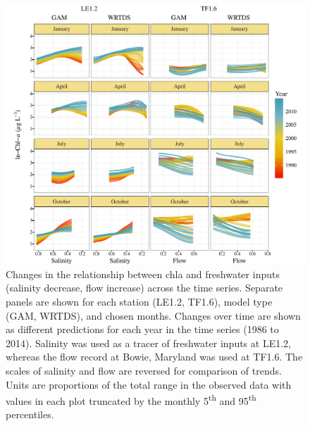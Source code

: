\documentclass{svjour3}\usepackage[]{graphicx}\usepackage[]{color}
\begin{document}
\begin{figure}[!ht]

{\centering \includegraphics[width=1.02\textwidth]{figs/dynafig-1} 

}

\caption{Changes in the relationship between \ac{chla} and freshwater inputs (salinity decrease, flow increase) across the time series.  Separate panels are shown for each station (LE1.2, TF1.6), model type (GAM, WRTDS), and chosen months.  Changes over time are shown as different predictions for each year in the time series (1986 to 2014).  Salinity was used as a tracer of freshwater inputs at LE1.2, whereas the flow record at Bowie, Maryland was used at TF1.6.  The scales of salinity and flow are reversed for comparison of trends. Units are proportions of the total range in the observed data with values in each plot truncated by the monthly 5\textsuperscript{th} and 95\textsuperscript{th} percentiles.}\label{fig:dynafig}
\end{figure}
\end{document}
